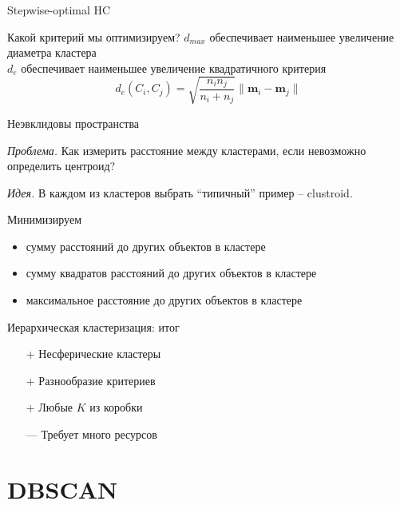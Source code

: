 \documentclass[10pt]{beamer}
\begin{document}
\begin{frame}{Stepwise-optimal HC}

Какой критерий мы оптимизируем?
\swo
$d_{max}$ обеспечивает наименьшее увеличение диаметра кластера \\
$d_e$ обеспечивает наименьшее увеличение квадратичного критерия
\[
d_e(C_i, C_j) = \sqrt{\frac{n_i n_j}{n_i + n_j}} \|\mathbf{m}_i -\mathbf{m}_j \|
\]

\end{frame}

\begin{frame}{Неэвклидовы пространства}

{\it Проблема. } Как измерить расстояние между кластерами, если невозможно определить центроид?

\vspace{1em}
{\it Идея. } В каждом из кластеров выбрать ``типичный'' пример -- clustroid.

\vspace{1em}
Минимизируем
\begin{itemize}
\item сумму расстояний до других объектов в кластере
\item сумму квадратов расстояний до других объектов в кластере
\item максимальное расстояние до других объектов в кластере
\end{itemize}

\end{frame}

\begin{frame}{Иерархическая кластеризация: итог}

\begin{itemize}
\item[+] Несферические кластеры
\item[+] Разнообразие критериев
\item[+] Любые $K$ из коробки
\item[---] Требует много ресурсов
\end{itemize}

\end{frame}


\section{DBSCAN}

\end{document}
